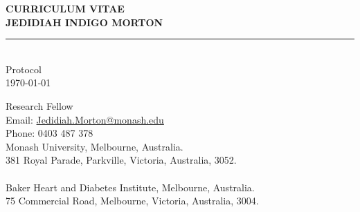 \documentclass[11pt]{article}
\newcommand{\thedate}{\today}
\begin{document}
\begin{titlepage}
    \begin{center}
        \Huge
        \textbf{CURRICULUM VITAE \\
JEDIDIAH INDIGO MORTON}
\rule{16cm}{2mm} \\
\Large
Protocol \\
\thedate \\
       \vfill
    \end{center}
        \Large

\noindent
Research Fellow \\
\color{blue}
Email: \href{mailto:Jedidiah.Morton@Monash.edu}{Jedidiah.Morton@monash.edu} \\
Phone: 0403 487 378 \\
\color{black}
Monash University, Melbourne, Australia. \\
381 Royal Parade, Parkville, Victoria, Australia, 3052. \\
 \\
Baker Heart and Diabetes Institute, Melbourne, Australia. \\
75 Commercial Road, Melbourne, Victoria, Australia, 3004. \\
\\
\end{titlepage}

\cite{MortonDLOGIA2023}

\clearpage

\end{document}
